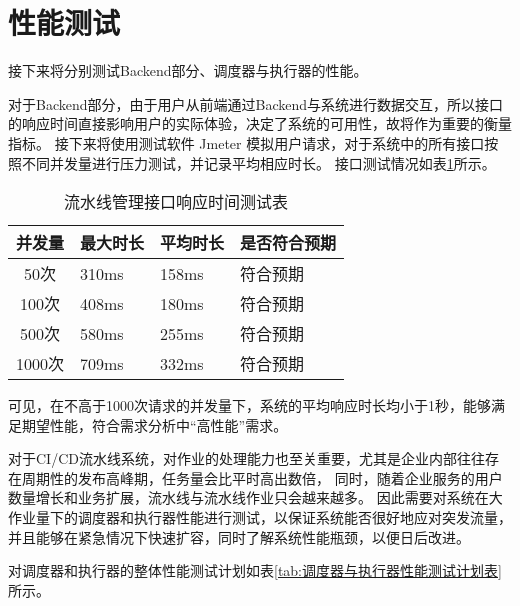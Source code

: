 \section{性能测试}
接下来将分别测试Backend部分、调度器与执行器的性能。

对于Backend部分，由于用户从前端通过Backend与系统进行数据交互，所以接口的响应时间直接影响用户的实际体验，决定了系统的可用性，故将作为重要的衡量指标。
接下来将使用测试软件 Jmeter 模拟用户请求，对于系统中的所有接口按照不同并发量进行压力测试，并记录平均相应时长。
接口测试情况如表\ref{tab:流水线管理接口响应时间测试表}所示。

\begin{table}[h]
  \centering
  \caption{流水线管理接口响应时间测试表}
  \label{tab:流水线管理接口响应时间测试表}
  \begin{tabular}{clll}
    \toprule
    并发量         & 最大时长            & 平均时长     & 是否符合预期                       \\
    \midrule
    50次         & 310ms              & 158ms     & 符合预期                 \\
    100次        & 408ms              & 180ms     & 符合预期                 \\
    500次        & 580ms              & 255ms     & 符合预期                     \\
    1000次       & 709ms              & 332ms     & 符合预期                     \\
    \bottomrule
  \end{tabular}
\end{table}

可见，在不高于1000次请求的并发量下，系统的平均响应时长均小于1秒，能够满足期望性能，符合需求分析中“高性能”需求。

对于CI/CD流水线系统，对作业的处理能力也至关重要，尤其是企业内部往往存在周期性的发布高峰期，任务量会比平时高出数倍，
同时，随着企业服务的用户数量增长和业务扩展，流水线与流水线作业只会越来越多。
因此需要对系统在大作业量下的调度器和执行器性能进行测试，以保证系统能否很好地应对突发流量，并且能够在紧急情况下快速扩容，同时了解系统性能瓶颈，以便日后改进。

对调度器和执行器的整体性能测试计划如表\ref{tab:调度器与执行器性能测试计划表}所示。

